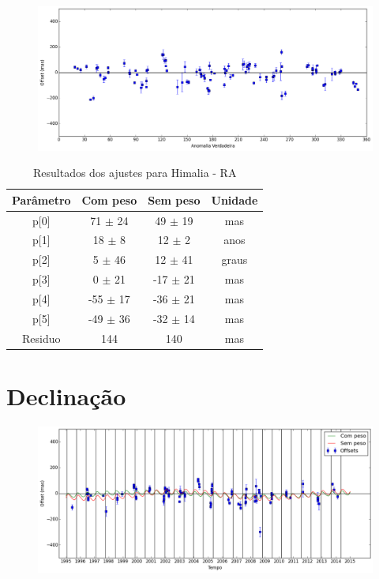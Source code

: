 \documentclass[11pt,a4paper]{report}
\begin{document}
\begin{figure}[h]
\includegraphics[scale=0.45]{Himalia/RA_anom.png}  
\end{figure}

\begin{table}[h!]
\caption{\label{Tab: Himalia-RA} Resultados dos ajustes para Himalia - RA}
\begin{centering}
\begin{tabular}{cccc}
\hline
\hline
Parâmetro & Com peso & Sem peso & Unidade\tabularnewline
\hline
p[0] & 71 $\pm$ 24 & 49 $\pm$ 19 & mas\\
p[1] & 18 $\pm$ 8 & 12 $\pm$ 2 & anos\\
p[2] & 5 $\pm$ 46 & 12 $\pm$ 41 & graus\\
p[3] & 0 $\pm$ 21 & -17 $\pm$ 21 & mas\\
p[4] & -55 $\pm$ 17 & -36 $\pm$ 21 & mas\\
p[5] & -49 $\pm$ 36 & -32 $\pm$ 14 & mas\\
Residuo & 144 & 140 & mas\\
\hline 
\end{tabular} 
\par\end{centering}
\end{table}

\section*{Declinação}

\begin{figure}[h]
\includegraphics[scale=0.45]{Himalia/DEC.png} 
\end{figure}
\end{document}
